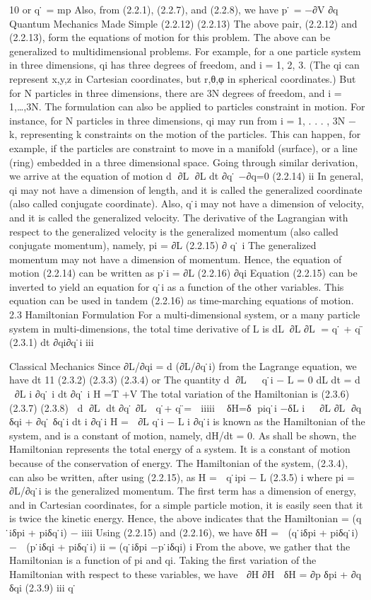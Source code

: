 \documentclass[
  9pt,
]{extbook}
\begin{document}
10 or
q ̇ = mp Also, from (2.2.1), (2.2.7), and (2.2.8), we have
p ̇ = −∂V ∂q
Quantum Mechanics Made Simple
(2.2.12)
(2.2.13)
The above pair, (2.2.12) and (2.2.13), form the equations of motion for this problem.
The above can be generalized to multidimensional problems. For example, for a one particle system in three dimensions, qi has three degrees of freedom, and i = 1, 2, 3. (The qi can represent x,y,z in Cartesian coordinates, but r,θ,φ in spherical coordinates.) But for N particles in three dimensions, there are 3N degrees of freedom, and i = 1,\ldots,3N. The formulation can also be applied to particles constraint in motion. For instance, for N particles in three dimensions, qi may run from i = 1, . . . , 3N − k, representing k constraints on the motion of the particles. This can happen, for example, if the particles are constraint to move
in a manifold (surface), or a line (ring) embedded in a three dimensional space. Going through similar derivation, we arrive at the equation of motion
d 􏰊∂L􏰋 ∂L
dt ∂q ̇ −∂q=0 (2.2.14)
ii
In general, qi may not have a dimension of length, and it is called the generalized coordinate (also called conjugate coordinate). Also, q ̇i may not have a dimension of velocity, and it is called the generalized velocity.
The derivative of the Lagrangian with respect to the generalized velocity is the generalized momentum (also called conjugate momentum), namely,
pi = ∂L (2.2.15) ∂ q ̇ i
The generalized momentum may not have a dimension of momentum. Hence, the equation of motion (2.2.14) can be written as
p ̇i = ∂L (2.2.16) ∂qi
Equation (2.2.15) can be inverted to yield an equation for q ̇i as a function of the other variables. This equation can be used in tandem (2.2.16) as time-marching equations of motion.
2.3 Hamiltonian Formulation
For a multi-dimensional system, or a many particle system in multi-dimensions, the total time derivative of L is
dL􏰝􏰊∂L ∂L􏰋
= q ̇ + q ̈ (2.3.1)
dt ∂qi∂q ̇i iii

Classical Mechanics
Since ∂L/∂qi = d (∂L/∂q ̇i) from the Lagrange equation, we have dt
11
(2.3.2)
(2.3.3)
(2.3.4)
or
The quantity
d􏰒 ∂L 􏰓
􏰝 q ̇i − L = 0
dL dt
=
d 􏰝􏰊∂L
i ∂q ̇ i dt ∂q ̇ i
H =T +V The total variation of the Hamiltonian is
(2.3.6)
(2.3.7)
(2.3.8)
􏰝􏰌d 􏰊∂L􏰋 dt ∂q ̇
∂L 􏰍 q ̇+ q ̈=
􏰋
iiiii
􏰒􏰓 δH=δ 􏰝piq ̇i −δL
i
􏰝
􏰝􏰊∂L ∂L􏰋 ∂q δqi + ∂q ̇ δq ̇i
dt i ∂q ̇i
H = 􏰝 ∂L q ̇i − L
i ∂q ̇i
is known as the Hamiltonian of the system, and is a constant of motion, namely, dH/dt = 0. As shall be shown, the Hamiltonian represents the total energy of a system. It is a constant of motion because of the conservation of energy.
The Hamiltonian of the system, (2.3.4), can also be written, after using (2.2.15), as
H = 􏰝 q ̇ipi − L (2.3.5)
i
where pi = ∂L/∂q ̇i is the generalized momentum. The first term has a dimension of energy, and in Cartesian coordinates, for a simple particle motion, it is easily seen that it is twice the kinetic energy. Hence, the above indicates that the Hamiltonian
= (q ̇iδpi + piδq ̇i) − iiii
Using (2.2.15) and (2.2.16), we have
δH = 􏰝 (q ̇iδpi + piδq ̇i) − 􏰝 (p ̇iδqi + piδq ̇i)
ii
=􏰝(q ̇iδpi −p ̇iδqi) i
From the above, we gather that the Hamiltonian is a function of pi and qi. Taking the first variation of the Hamiltonian with respect to these variables, we have
􏰝􏰊∂H ∂H 􏰋
δH = ∂p δpi + ∂q δqi (2.3.9)
iii
q ̇
\end{document}
